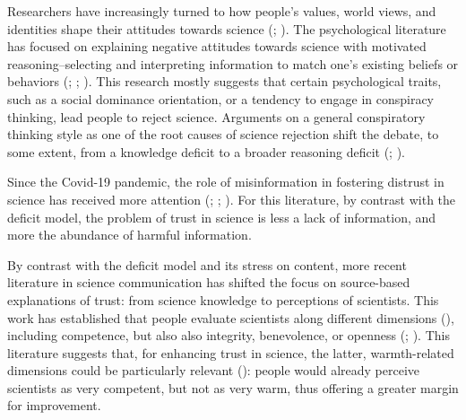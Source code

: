 \documentclass[
  jou,
  floatsintext,
  longtable,
  nolmodern,
  notxfonts,
  notimes,
  colorlinks=true,linkcolor=blue,citecolor=blue,urlcolor=blue]{apa7}
\begin{document}
Researchers have increasingly turned to how people's values, world
views, and identities shape their attitudes towards science
(;
). The psychological literature has focused on
explaining negative attitudes towards science with motivated
reasoning--selecting and interpreting information to match one's
existing beliefs or behaviors
(;
;
). This research mostly suggests that certain
psychological traits, such as a social dominance orientation, or a
tendency to engage in conspiracy thinking, lead people to reject
science. Arguments on a general conspiratory thinking style as one of
the root causes of science rejection shift the debate, to some extent,
from a knowledge deficit to a broader reasoning deficit
(;
).

Since the Covid-19 pandemic, the role of misinformation in fostering
distrust in science has received more attention
(;
;
). For this literature, by contrast with the deficit model,
the problem of trust in science is less a lack of information, and more
the abundance of harmful information.

By contrast with the deficit model and its stress on content, more
recent literature in science communication has shifted the focus on
source-based explanations of trust: from science knowledge to
perceptions of scientists. This work has established that people
evaluate scientists along different dimensions
(),
including competence, but also also integrity, benevolence, or openness
(; ). This literature suggests that, for enhancing trust in
science, the latter, warmth-related dimensions could be particularly
relevant (): people would already perceive scientists as very competent, but
not as very warm, thus offering a greater margin for improvement.
\end{document}
